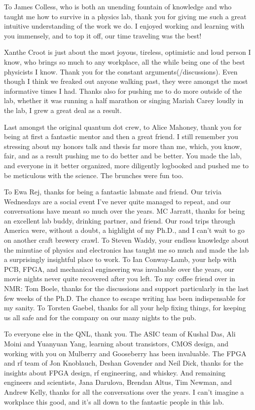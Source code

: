 To James Colless, who is both an unending fountain of knowledge and who taught me how to survive in a physics lab,
thank you for giving me such a great intuitive understanding of the work we do. I enjoyed working and learning with
you immensely, and to top it off, our time traveling was the best!

Xanthe Croot is just about the most joyous, tireless, optimistic and loud person I know, who brings so much to any
workplace, all the while being one of the best physicists I know. Thank you for the constant arguments(/discussions).
Even though I think we freaked out anyone walking past, they were amongst the most informative times I had.
Thanks also for pushing me to do more outside of the lab, whether it was running a half marathon or singing Mariah Carey
loudly in the lab, I grew a great deal as a result.

Last amongst the original quantum dot crew, to Alice Mahoney, thank you for being at first a fantastic mentor and then
a great friend. I still remember you stressing about my honors talk and thesis far more than me, which, you know, fair,
and as a result pushing me to do better and be better. You made the lab, and everyone in it better organized, more diligently
logbooked and pushed me to be meticulous with the science. The brunches were fun too.

To Ewa Rej, thanks for being a fantastic labmate and friend. Our trivia Wednesdays are a social event I've never quite managed
to repeat, and our conversations have meant so much over the years. MC Jarratt, thanks for being an excellent lab buddy, drinking
partner, and friend. Our road trips through America were, without a doubt, a highlight of my Ph.D., and I can't wait to go on another
craft brewery crawl. To Steven Waddy, your endless knowledge about the minutiae of physics and electronics has taught me so much and made the lab a surprisingly insightful place to work. To Ian Conway-Lamb, your help with PCB, FPGA, and mechanical engineering
was invaluable over the years, our movie nights never quite recovered after you left. To my coffee friend over in NMR: Tom Boele,
thanks for the discussions and support particularly in the last few weeks of the Ph.D. The chance to escape writing has been
indispensable for my sanity. To Torsten Gaebel, thanks for all your help fixing things, for keeping us all safe and for the
company on our many nights to the pub.

To everyone else in the QNL, thank you. The ASIC team of Kushal Das, Ali Moini and Yuanyuan Yang, learning about transistors,
CMOS design, and working with you on Mulberry and Gooseberry has been invaluable. The FPGA and rf team of Jon Knoblauch, Deshan Govender
and Neil Dick, thanks for the insights about FPGA design, rf engineering, and whiskey. And remaining engineers and scientists,
Jana Darulova, Brendan Altus, Tim Newman, and Andrew Kelly, thanks for all the conversations over the years. I can't imagine a workplace
this good, and it's all down to the fantastic people in this lab.

